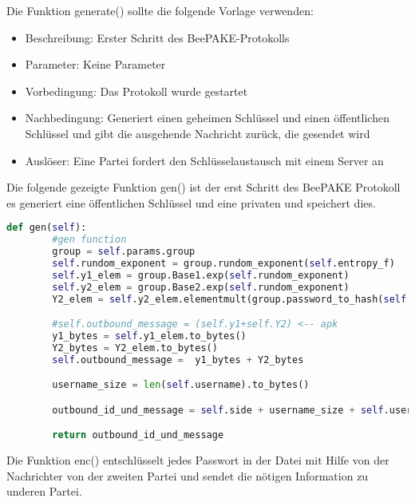 \documentclass[conference, compsoc]{IEEEtran}
\begin{document}
Die Funktion generate() sollte die folgende Vorlage verwenden:
\begin{itemize}

\item Beschreibung: Erster Schritt des BeePAKE-Protokolls
\item Parameter: Keine Parameter
\item Vorbedingung: Das Protokoll wurde gestartet
\item Nachbedingung: Generiert einen geheimen Schlüssel und einen öffentlichen
	Schlüssel und gibt die ausgehende Nachricht zurück, die gesendet wird
\item Auslöser: Eine Partei fordert den Schlüsselaustausch mit einem Server an
\end{itemize}

Die folgende gezeigte Funktion gen() ist der erst Schritt des BeePAKE Protokoll
es generiert eine öffentlichen Schlüssel und eine privaten und speichert dies.

\begin{lstlisting}[language=Python]
def gen(self):
        #gen function
        group = self.params.group
        self.rundom_exponent = group.rundom_exponent(self.entropy_f)
        self.y1_elem = group.Base1.exp(self.rundom_exponent)
        self.y2_elem = group.Base2.exp(self.rundom_exponent)
        Y2_elem = self.y2_elem.elementmult(group.password_to_hash(self.pw))

        #self.outbound_message = (self.y1+self.Y2) <-- apk
        y1_bytes = self.y1_elem.to_bytes()
        Y2_bytes = Y2_elem.to_bytes()
        self.outbound_message =  y1_bytes + Y2_bytes

        username_size = len(self.username).to_bytes()

        outbound_id_und_message = self.side + username_size + self.username + self.outbound_message

        return outbound_id_und_message
\end{lstlisting}

Die Funktion enc() entschlüsselt jedes Passwort in der Datei mit Hilfe von der
Nachrichter von der zweiten Partei und sendet die nötigen Information zu
underen Partei.
\end{document}
